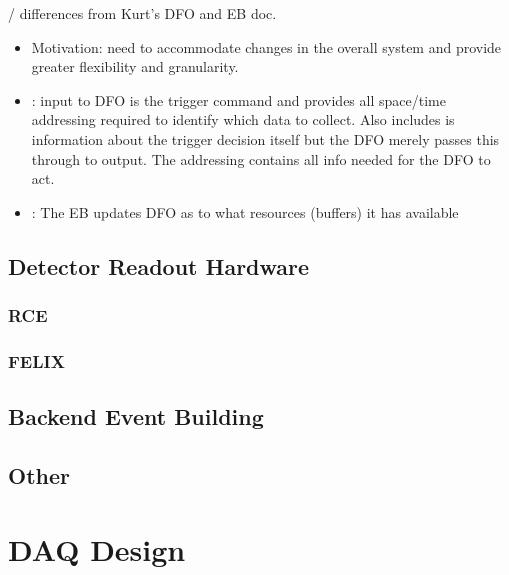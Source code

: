 / differences from Kurt's DFO and EB doc.
\begin{itemize}
\item Motivation: need to accommodate changes in the overall system and provide greater flexibility and granularity.
\item {}: input to DFO is the trigger command and provides all space/time addressing required to identify which data to collect.  Also includes is information about the trigger decision itself but the DFO merely passes this through to output.  The addressing contains all info needed for the DFO to act.
\item {}: The EB updates DFO as to what resources (buffers) it has available
\end{itemize}

\subsection{Detector Readout Hardware}


\subsubsection{RCE}

\subsubsection{FELIX}

\subsection{Backend Event Building}

\subsection{Other}

\section{DAQ Design}
\label{sec:fd-daq:design}


